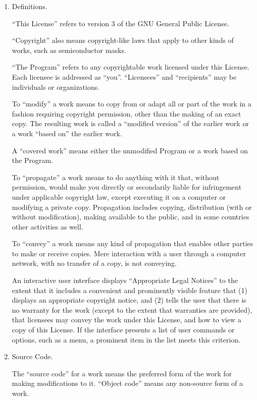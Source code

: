 \documentclass[11pt]{article}
\begin{document}
\begin{enumerate}

\addtocounter{enumi}{-1}

\item Definitions.

``This License'' refers to version 3 of the GNU General Public License.

``Copyright'' also means copyright-like laws that apply to other kinds of
works, such as semiconductor masks.

``The Program'' refers to any copyrightable work licensed under this
License.  Each licensee is addressed as ``you''.  ``Licensees'' and
``recipients'' may be individuals or organizations.

To ``modify'' a work means to copy from or adapt all or part of the work
in a fashion requiring copyright permission, other than the making of an
exact copy.  The resulting work is called a ``modified version'' of the
earlier work or a work ``based on'' the earlier work.

A ``covered work'' means either the unmodified Program or a work based
on the Program.

To ``propagate'' a work means to do anything with it that, without
permission, would make you directly or secondarily liable for
infringement under applicable copyright law, except executing it on a
computer or modifying a private copy.  Propagation includes copying,
distribution (with or without modification), making available to the
public, and in some countries other activities as well.

To ``convey'' a work means any kind of propagation that enables other
parties to make or receive copies.  Mere interaction with a user through
a computer network, with no transfer of a copy, is not conveying.

An interactive user interface displays ``Appropriate Legal Notices''
to the extent that it includes a convenient and prominently visible
feature that (1) displays an appropriate copyright notice, and (2)
tells the user that there is no warranty for the work (except to the
extent that warranties are provided), that licensees may convey the
work under this License, and how to view a copy of this License.  If
the interface presents a list of user commands or options, such as a
menu, a prominent item in the list meets this criterion.

\item Source Code.

The ``source code'' for a work means the preferred form of the work
for making modifications to it.  ``Object code'' means any non-source
form of a work.


\end{enumerate}
\end{document}
